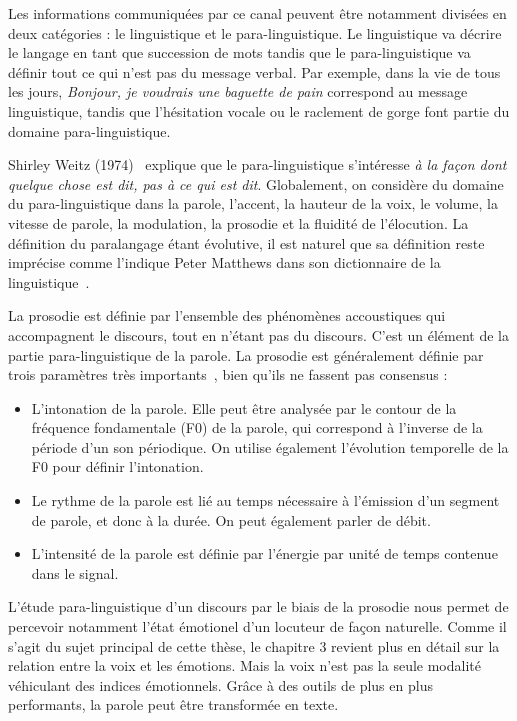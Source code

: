 Les informations communiquées par ce canal peuvent être notamment divisées en deux catégories : le linguistique et le para-linguistique.
Le linguistique va décrire le langage en tant que succession de mots tandis que le para-linguistique va définir tout ce qui n'est pas du message verbal. Par exemple, dans la vie de tous les jours, \textit{Bonjour, je voudrais une baguette de pain} correspond au message linguistique, tandis que l'hésitation vocale ou le raclement de gorge font partie du domaine para-linguistique.

Shirley Weitz (1974)~\cite{Weitz1974} explique que le para-linguistique s'intéresse \textit{à la façon dont quelque chose est dit, pas à ce qui est dit}. Globalement, on considère du domaine du para-linguistique dans la parole, l'accent, la hauteur de la voix, le volume, la vitesse de parole, la modulation, la prosodie et la fluidité de l'élocution.
La définition du paralangage étant évolutive, il est naturel que sa définition reste imprécise comme l'indique Peter Matthews dans son dictionnaire de la linguistique~\cite{Matthews2014}.

La prosodie est définie par l'ensemble des phénomènes accoustiques qui accompagnent le discours, tout en n'étant pas du discours. C'est un élément de la partie para-linguistique de la parole. La prosodie est généralement définie par trois paramètres très importants~\cite{Srinivasan2003,Dohen2004}, bien qu'ils ne fassent pas consensus :
\begin{itemize}
  \item L'intonation de la parole. Elle peut être analysée par le contour de la fréquence fondamentale (F0) de la parole, qui correspond à l'inverse de la période d'un son périodique. On utilise également l'évolution temporelle de la F0 pour définir l'intonation.
  \item Le rythme de la parole est lié au temps nécessaire à l'émission d'un segment de parole, et donc à la durée. On peut également parler de débit.
  \item L'intensité de la parole est définie par l'énergie  par unité de temps contenue dans le signal.
\end{itemize}
L'étude para-linguistique d'un discours par le biais de la prosodie nous permet de percevoir notamment l'état émotionel d'un locuteur de façon naturelle. Comme il s'agit du sujet principal de cette thèse, le chapitre 3 revient plus en détail sur la relation entre la voix et les émotions. Mais la voix n'est pas la seule modalité véhiculant des indices émotionnels. Grâce à des outils de plus en plus performants, la parole peut être transformée en texte.

